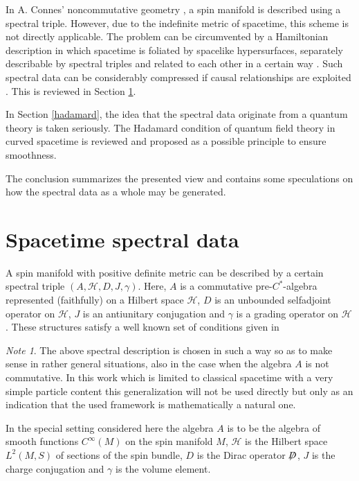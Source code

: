 \documentclass[a4paper,10pt,oneside]{amsart}
\theoremstyle{plain}
\theoremstyle{definition}
\theoremstyle{remark}
\newtheorem{note}{Note}
\begin{document}
In A. Connes' noncommutative geometry
\cite{Connes94,Connes95,Connes96a}, a spin manifold is described
using a spectral triple. However, due to the indefinite metric of
spacetime, this scheme is not directly applicable. The problem can
be circumvented by a Hamiltonian description in which spacetime is
foliated by spacelike hypersurfaces, separately describable by
spectral triples and related to each other in a certain way
\cite{Hawkins97}. Such spectral data can be considerably
compressed if causal relationships are exploited \cite{Kopf98}.
This is reviewed in Section \ref{spectraldata}.



In Section \ref{hadamard}, the idea that the spectral data
originate from a quantum theory is taken seriously. The Hadamard
condition of quantum field theory in curved spacetime
\cite{Wald1978a,Wald1978b,Fulling-Sweeny-Wald,
Fulling-Narcowich-Wald,Kay-Wald,Verch1994,Radzikowski1996a,
Radzikowski1996b,Junker,Wellmann,Hollands1999a,Hollands1999b}
is reviewed and proposed as a possible principle
to ensure smoothness.



The conclusion summarizes the presented view and contains some
speculations on how the spectral data as a whole may be generated.


\section{Spacetime spectral data}\label{spectraldata}


A spin manifold with positive definite metric can be described
\cite{Connes94,Connes95,Connes96a} by a certain spectral triple
$(A, \mathcal{H}, D, J,\gamma)$.
 Here, $A$ is a commutative pre-${C}^{\ast}$-algebra
represented (faithfully) on a Hilbert space $\mathcal{H}$, $D$ is
an unbounded selfadjoint operator on $\mathcal{H}$, $J$ is an
antiunitary conjugation and $\gamma$ is a grading operator on
$\mathcal{H}$. These structures satisfy a well known set of conditions
given in \cite{Connes96a}

\begin{note}
The above spectral description is chosen in such a way so as to
make sense in rather general situations, also in the case when the
algebra $A$ is not commutative. In this work which is limited to
classical spacetime with a very simple particle content this
generalization will not be used directly but only as an indication
that the used framework is mathematically a natural one.


In the special setting considered here the algebra $A$ is to be
the algebra of smooth functions ${C}^{\infty}(M)$ on the spin
manifold $M$, $\mathcal{H}$ is the Hilbert space ${L}^{2}(M,S)$ of
sections of the spin bundle, $D$ is the Dirac operator $\not\!\!
D$, $J$ is the charge conjugation and $\gamma$ is the volume
element.
\end{note}
\end{document}
